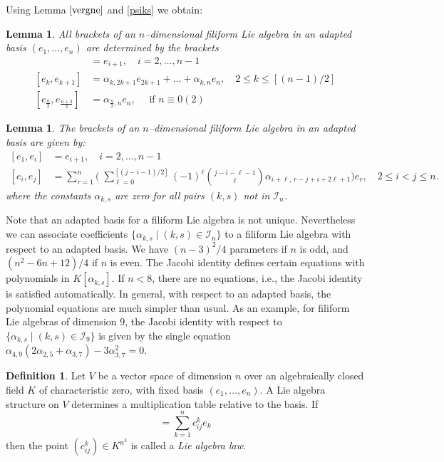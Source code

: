 \documentclass[12pt]{amsart}
\newtheorem{lem}[thm]{Lemma}
\theoremstyle{definition}
\newtheorem{defi}[thm]{Definition}
\theoremstyle{remark}
\newcommand{\CI}{\mathcal{I}}
\newcommand{\al}{\alpha}
\begin{document}
Using Lemma $\ref{vergne}$ and \eqref{psiks} we obtain:

\begin{lem}
All brackets of an $n$--dimensional filiform Lie algebra in an adapted
basis $(e_1,\ldots ,e_n)$ are determined by the brackets
\begin{align*}
[e_1,e_i] & =e_{i+1}, \quad i=2,\dots ,n-1 \\
[e_k,e_{k+1}] & = \al_{k,2k+1}e_{2k+1}+\ldots  + \al_{k,n}e_n,\quad
2\le k \le
[(n-1)/2] \\
[e_{\frac{n}{2}},e_{\frac{n+2}{2}}] & = \al_{\frac{n}{2},n}e_n, \quad
\text{ if }n \equiv 0 (2)
\end{align*}
\end{lem}

\begin{lem}
The brackets of an $n$--dimensional filiform Lie algebra in an adapted
basis are given by:
\begin{align}\label{lie}
[e_1,e_i] & =e_{i+1}, \quad i=2,\dots ,n-1 \\
[e_i,e_j] & =\sum_{r=1}^n\biggl(\;\sum_{\ell=0}^{[(j-i-1)/2]} (-1)^\ell
{ j-i-\ell-1 \choose \ell}\al_{i+\ell,\, r-j+i+2\ell+1}\biggr)e_r,
 \quad 2 \le i<j \le n.
\end{align}
where the constants $\al_{k,s}$ are zero for all pairs $(k,s)$ not in $\CI_n$.
\end{lem}

Note that an adapted basis for a filiform Lie algebra is not unique.
Nevertheless we can associate coefficients $\{\al_{k,s} \mid (k,s) \in \CI_n\}$
to a filiform Lie algebra with respect to an adapted basis.
We have $(n-3)^2/4$ parameters if $n$ is odd, and $(n^2-6n+12)/4$ if $n$ is even. 
The Jacobi identity defines certain equations with polynomials in $K[\al_{k,s}]$.
If $n<8$, there are no equations, i.e., the Jacobi identity is
satisfied automatically.
In general, with respect to an adapted basis, the polynomial equations are
much simpler than usual. As an example, for filiform Lie algebras of dimension
$9$, the Jacobi identity with respect to $\{\al_{k,s} \mid (k,s) \in \CI_9\}$ is given by
the single equation $\al_{4,9}(2\al_{2,5}+\al_{3,7})-3\al_{3,7}^2=0.$

\begin{defi}
Let $V$ be a vector space of dimension $n$ over an algebraically closed
field $K$ of characteristic zero, with fixed
basis $(e_1,\ldots , e_n)$.
A Lie algebra structure on $V$ determines a multiplication table relative
to the basis. If
\begin{equation*}
[e_i,e_j] = \sum_{k=1}^n c_{ij}^k e_k
\end{equation*}
then the point $(c_{ij}^k) \in K^{n^3}$ is called a {\it Lie algebra law}.
\end{defi}
\end{document}
